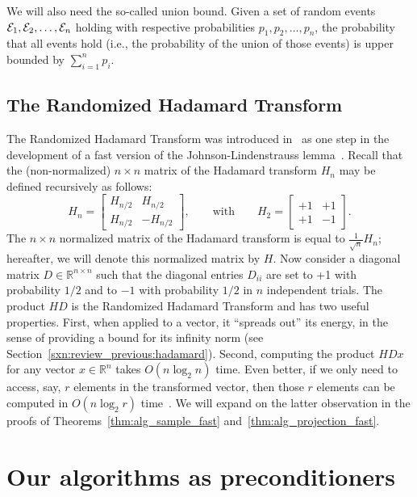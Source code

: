 \documentclass[11pt]{article}
\begin{document}
We will also need the so-called union bound. Given a set of random events ${\cal E}_1,{\cal E}_2,\ldots,{\cal E}_{n}$ holding with respective probabilities $p_1,p_2,\ldots,p_n$, the probability that all events hold (i.e., the probability of the union of those events) is upper bounded by $\sum_{i=1}^n p_i$.

\subsection{The Randomized Hadamard Transform}\label{sxn:RHT}

The Randomized Hadamard Transform was introduced in~\cite{AC06} as one step in the development of a fast version of the Johnson-Lindenstrauss lemma~\cite{AC06,Matousek08_RSA}. Recall that the (non-normalized) $n \times n$ matrix of the Hadamard transform $H_n$ may be defined recursively as follows:
$$ H_n = \left[
\begin{array}{cc}
  H_{n/2} & H_{n/2} \\
  H_{n/2} & -H_{n/2}
\end{array}\right]   ,
\qquad \mbox{with} \qquad
H_2 = \left[
\begin{array}{cc}
  +1 & +1 \\
  +1 & -1
\end{array}\right].
$$
The $n \times n$ normalized matrix of the Hadamard transform is equal to $\frac{1}{\sqrt{n}}H_n$; hereafter, we will denote this normalized matrix by $H$. Now consider a diagonal matrix $D \in \mathbb{R}^{n \times n}$ such that the diagonal entries $D_{ii}$ are set to +1 with probability $1/2$ and to $-1$ with probability $1/2$ in $n$ independent trials. The product $HD$ is the Randomized Hadamard Transform and has two useful properties. First, when applied to a vector, it ``spreads out'' its energy, in the sense of providing a bound for its infinity norm (see Section~\ref{sxn:review_previous:hadamard}). Second, computing the product $HDx$ for any vector $x \in \mathbb{R}^n$ takes $O(n\log_2 n)$ time. Even better, if we only need to access, say, $r$ elements in the transformed vector, then those $r$ elements can be computed in $O(n \log_2 r )$ time~\cite{AL08}. We will expand on the latter observation in the proofs of Theorems~\ref{thm:alg_sample_fast} and~\ref{thm:alg_projection_fast}.


\section{Our algorithms as preconditioners}\label{sxn:precond}
\end{document}
